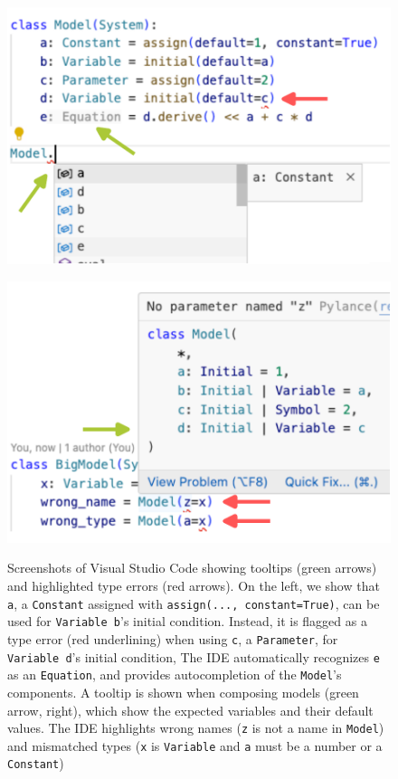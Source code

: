 \documentclass[namedate,numsec,webpdf,modern,large]{oup-authoring-template}
\theoremstyle{thmstyleone}%
\theoremstyle{thmstyletwo}%
\theoremstyle{thmstylethree}%
\begin{document}
\begin{figure}[t]

  \begin{minipage}[b]{0.50\linewidth}
  {
      \centering 
      \includegraphics[width=\textwidth]{src/ide/ide1.pdf}
  }
  \end{minipage}%
  \begin{minipage}[b]{0.50\linewidth}
  {
      \centering
      \includegraphics[width=\textwidth]{src/ide/ide2.pdf}
  }
  \end{minipage}%
  
  \caption{
      \label{fig-ide}
      Screenshots of Visual Studio Code showing
      tooltips (green arrows) and
      highlighted type errors (red arrows).
      On the left,
      we show that \texttt{a},
      a \texttt{Constant} assigned with \texttt{assign(...,\ constant=True)},
      can be used for \texttt{Variable b}'s initial condition.
      Instead,
      it is flagged as a type error (red underlining)
      when using \texttt{c}, a \texttt{Parameter},
      for \texttt{Variable d}'s initial condition,
      The IDE automatically recognizes \texttt{e} as an \texttt{Equation},
      and provides autocompletion of the \texttt{Model}'s components.
      A tooltip is shown when composing models (green arrow, right),
      which show the expected variables and their default values.
      The IDE highlights wrong names (\texttt{z} is not a name in \texttt{Model})
      and mismatched types (\texttt{x} is \texttt{Variable} and \texttt{a} must be a number or a \texttt{Constant})
  }
  

\end{figure}
\end{document}

